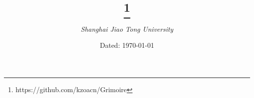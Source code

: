 \documentclass[titlepage, a4paper]{book}
\title{\Huge{\textgoth{Grimoire's Standard Code Library}}\thanks{https://github.com/kzoacn/Grimoire}}
\author{\emph{Shanghai Jiao Tong University}}
\date{Dated: \today}
\begin{document}
	\maketitle
	\tableofcontents
	\begin{spacing}{0.8}
		
	\end{spacing}
\end{document}
